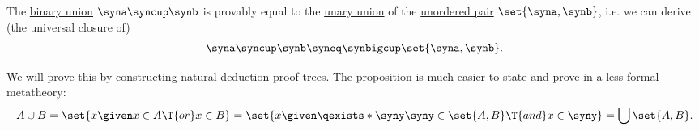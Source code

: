 \begin{proposition}\label{thm:binary_set_union_via_pair}
  The \hyperref[def:set_union/binary]{binary union} \( \syna \syncup \synb \) is provably equal to the \hyperref[def:set_union/unary]{unary union} of the \hyperref[def:unordered_pair]{unordered pair} \( \set{ \syna, \synb } \), i.e. we can derive (the universal closure of)
  \begin{equation*}
    \syna \syncup \synb \syneq \synbigcup \set{ \syna, \synb }.
  \end{equation*}
\end{proposition}
\begin{comments}
  \item We will prove this by constructing \hyperref[def:fol_natural_deduction_proof_tree]{natural deduction proof trees}. The proposition is much easier to state and prove in a less formal metatheory:
  \begin{equation*}
    A \cup B = \set{ x \given x \in A \T{or} x \in B } = \set{ x \given \qexists* \syny \syny \in \set{ A, B } \T{and} x \in \syny } = \bigcup \set{ A, B }.
  \end{equation*}
\end{comments}
